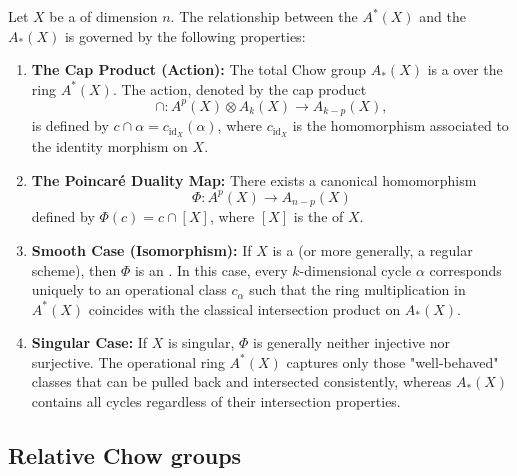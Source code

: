 \begin{proposition} 
    \TODO{}
Let $X$ be a  of dimension $n$. 
The relationship between the  $A^*(X)$ and the  $A_*(X)$ is governed by the following properties:

\begin{enumerate}
    \item \textbf{The Cap Product (Action):} The total Chow group $A_*(X)$ is a  over the ring $A^*(X)$. The action, denoted by the cap product 
    \[ \cap: A^p(X) \otimes A_k(X) \to A_{k-p}(X), \]
    is defined by $c \cap \alpha = c_{\mathrm{id}_X}(\alpha)$, where $c_{\mathrm{id}_X}$ is the homomorphism associated to the identity morphism on $X$.
    
    \item \textbf{The Poincaré Duality Map:} There exists a canonical homomorphism 
    \[ \Phi: A^p(X) \to A_{n-p}(X) \]
    defined by $\Phi(c) = c \cap [X]$, where $[X]$ is the  of $X$.
    
    \item \textbf{Smooth Case (Isomorphism):} If $X$ is a  (or more generally, a regular scheme), then $\Phi$ is an . In this case, every $k$-dimensional cycle $\alpha$ corresponds uniquely to an operational class $c_\alpha$ such that the ring multiplication in $A^*(X)$ coincides with the classical intersection product on $A_*(X)$.
    
    \item \textbf{Singular Case:} If $X$ is singular, $\Phi$ is generally neither injective nor surjective. The operational ring $A^*(X)$ captures only those "well-behaved" classes that can be pulled back and intersected consistently, whereas $A_*(X)$ contains all cycles regardless of their intersection properties.
\end{enumerate}
\end{proposition}



\subsection{Relative Chow groups}

